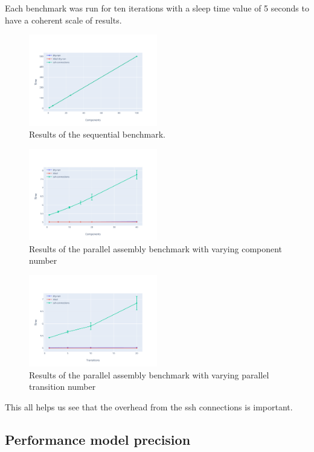Each benchmark was run for ten iterations with a sleep time value of 5 seconds to have a coherent scale of results.





\begin{figure}[h]
  \begin{center} 
    \includegraphics[width=0.5\textwidth]{./images/evaluations_sequential.pdf}
    \caption{Results of the sequential benchmark.}
    \label{fig:dryrunseq}
  \end{center}
\end{figure}

\begin{figure}[h]
  \begin{center} 
    \includegraphics[width=0.5\textwidth]{./images/evaluations_par_component.pdf}
    \caption{Results of the parallel assembly benchmark with varying component number}
    \label{fig:dryrunseq}
  \end{center}
\end{figure}
\begin{figure}[h]
  \begin{center} 
    \includegraphics[width=0.5\textwidth]{./images/evaluations_par_transitions.pdf}
    \caption{Results of the parallel assembly benchmark with varying parallel transition number}
    \label{fig:dryrunseq}
  \end{center}
\end{figure}

This all helps us see that the overhead from the ssh connections is important.
\subsection{Performance model precision}


